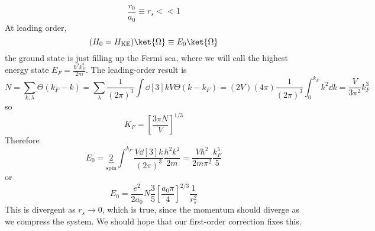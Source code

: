 \documentclass[a4paper,twoside,master.tex]{subfiles}
\begin{document}
\begin{equation}
    \frac{r_0}{a_0} \equiv r_s << 1
\end{equation}
At leading order,
\begin{equation}
    (H_0 = H_{\text{KE}})\ket{\Omega} \equiv E_0\ket{\Omega}
\end{equation}
the ground state is just filling up the Fermi sea, where we will call the highest energy state $ E_F = \frac{\hbar^2 k_F^2}{2m} $. The leading-order result is
\begin{equation}
    N = \sum_{k, \lambda} \Theta(k_F - k) = \sum_{\lambda}  \frac{1}{(2 \pi)^3}\int \dd[3]{k} V \Theta(k - k_F) = (2V)(4 \pi) \frac{1}{(2 \pi)^3} \int_0^{k_F} k^2 \dd{k} = \frac{V}{3 \pi^2} k_F^3
\end{equation}
so
\begin{equation}
    K_F = \left[ \frac{3 \pi N}{V} \right]^{1/3}
\end{equation}
Therefore
\begin{equation}
    E_0 = \underbrace{2}_{\text{spin}} \int^{k_F} \frac{V \dd[3]{k}}{(2 \pi)^3} \frac{\hbar^2 k^2}{2m} = \frac{V \hbar^2}{2m\pi^2} \frac{k_F^5}{5}
\end{equation}
or
\begin{equation}
    E_0 = \frac{e^2}{2 a_0} N \frac{3}{5} \left[ \frac{a_0 \pi}{4} \right]^{2/3} \frac{1}{r_s^2}
\end{equation}
This is divergent as $ r_s \to 0 $, which is true, since the momentum should diverge as we compress the system. We should hope that our first-order correction fixes this.
\end{document}
